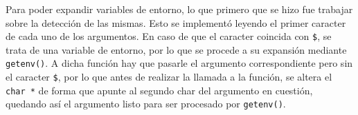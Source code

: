\documentclass{article}
\begin{document}
Para poder expandir variables de entorno, lo que primero que se hizo fue trabajar sobre la detección de las mismas. Esto se implementó leyendo el primer caracter de cada uno de los argumentos. En caso de que el caracter coincida con \texttt{\$}, se trata de una variable de entorno, por lo que se procede a su expansión mediante \texttt{getenv()}. A dicha función hay que pasarle el argumento correspondiente pero sin el caracter \texttt{\$}, por lo que antes de realizar la llamada a la función, se altera el \texttt{char *} de forma que apunte al segundo char del argumento en cuestión, quedando así el argumento listo para ser procesado por \texttt{getenv()}.


\newpage
\end{document}
